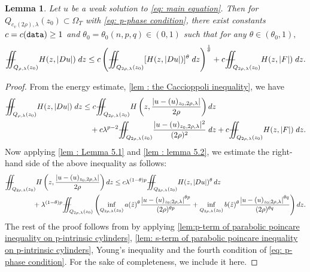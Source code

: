 \documentclass[11pt,oneside, english,reqno,twoside a4paper]{amsart}
\newtheorem{lemma}{Lemma}[section]
\theoremstyle{definition}
\numberwithin{theorem}{section}
\numberwithin{equation}{section}
\newcommand{\la}{\lambda}
\newcommand{\iintss}{{\int\hspace{-0.28cm}\int}}
\newcommand{ \miints }{{\iintss\hspace{-0.56cm} -\hspace{-0.15cm}-}}
\newcommand{\miint}[1]{{\miints_{\hspace{-0.13cm}#1}}}
\begin{document}
\begin{lemma}\label{lem : lemma 5.3}
    Let $u$ be a weak solution to \eqref{eq: main equation}. Then for $Q_{c_v(2 \rho),\lambda}\left(z_0\right) \subset \Omega_T$ with \eqref{eq: p-phase condition}, there exist constants $c=c(\textnormal{\texttt{data}}) \geq 1$ and $\theta_0=\theta_0(n,p,q) \in (0,1)$ such that for any $\theta\in (\theta_0,1),$
    \begin{align*}
        \miint{Q_{\rho,\lambda}(z_0)} H(z,|Du|)\; dz  \leq c \left(\miint{Q_{2\rho,\lambda}(z_0)} [H(z,|Du|)]^\theta\;dz\right)^\frac{1}{\theta}+c\miint{Q_{2\rho,\lambda}(z_0)} H(z,|F|)\; dz.
    \end{align*}
\end{lemma}
\begin{proof}
From the energy estimate,  \cref{lem : the Caccioppoli inequality}, we have
\begin{align*}
\miint{Q_{\rho, \lambda}(z_0)}H(z,|Du|)\;dz
& \leq c\miint{Q_{2\rho, \lambda}(z_0)}  H\left(z,\frac{|u-(u)_{z_0, 2\rho, \lambda}|}{2\rho}\right) dz\\
&\quad + c\la^{p-2}\miint{Q_{2\rho, \lambda}(z_0)}\frac{|u-(u)_{z_0, 2\rho, \lambda}|^2}{(2\rho)^2}\;dz +c\miint{Q_{2\rho, \lambda}(z_0)} H(z,|F|) \;dz.
\end{align*}  
Now applying \cref{lem : Lemma 5.1} and  \cref{lem : lemma 5.2}, we estimate the right-hand side of the above inequality as follows:
\begin{align*}
&\miint{Q_{2\rho, \lambda}(z_0)}  H\left(z,\frac{|u-(u)_{z_0, 2\rho, \lambda}|}{2\rho}\right) dz \leq c \la^{(1-\theta)p} \miint{Q_{2\rho,\lambda}(z_0)} H(z, |Du|)^{\theta}\, dz\\
& \qquad \qquad + \la^{(1-\theta)p} \miint{Q_{2\rho,\lambda}(z_0)} \left(\inf_{Q_{2\rho, \lambda}(z_0)}a(\tilde{z})^{\theta}\frac{\left|u-(u)_{z_0 ; 2 \rho,\lambda}\right|^{\theta p}}{(2 \rho)^{\theta p}}+ \inf _{Q_{2 \rho,\lambda}\left(z_0\right)} b(\tilde{z})^\theta \frac{\left|u-(u)_{z_0 ; 2 \rho,\lambda}\right|^{\theta q}}{(2 \rho)^{\theta q}} \right) dz.   
\end{align*}
The rest of the proof follows from \cite[Lemma 4.5]{2023_Gradient_Higher_Integrability_for_Degenerate_Parabolic_Double-Phase_Systems} by applying \cref{lem:p-term of parabolic poincare inequality on p-intrinsic cylinders}, \cref{lem: s-term of parabolic poincare inequality on p-intrinsic cylinders}, Young's inequality and the fourth condition of \eqref{eq: p-phase condition}. For the sake of completeness, we include it here.


\end{proof}
\end{document}
